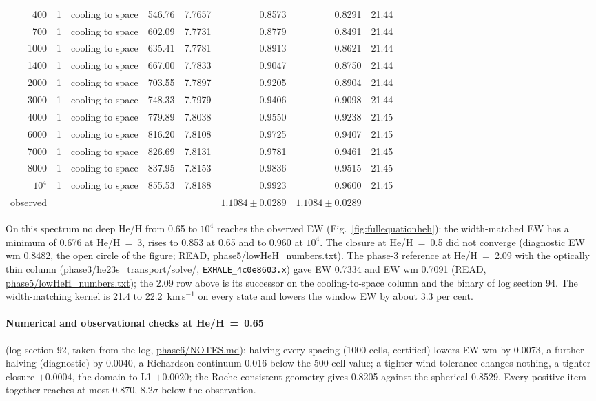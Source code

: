 \documentclass[11pt]{my_memo}
\begin{document}
\begin{longtable}{@{}r r l r r r r r@{}}
400 & 1 & cooling to space & 546.76 & 7.7657 & 0.8573 & 0.8291 & 21.44\\
700 & 1 & cooling to space & 602.09 & 7.7731 & 0.8779 & 0.8491 & 21.44\\
1000 & 1 & cooling to space & 635.41 & 7.7781 & 0.8913 & 0.8621 & 21.44\\
1400 & 1 & cooling to space & 667.00 & 7.7833 & 0.9047 & 0.8750 & 21.44\\
2000 & 1 & cooling to space & 703.55 & 7.7897 & 0.9205 & 0.8904 & 21.44\\
3000 & 1 & cooling to space & 748.33 & 7.7979 & 0.9406 & 0.9098 & 21.44\\
4000 & 1 & cooling to space & 779.89 & 7.8038 & 0.9550 & 0.9238 & 21.45\\
6000 & 1 & cooling to space & 816.20 & 7.8108 & 0.9725 & 0.9407 & 21.45\\
7000 & 1 & cooling to space & 826.69 & 7.8131 & 0.9781 & 0.9461 & 21.45\\
8000 & 1 & cooling to space & 837.95 & 7.8153 & 0.9836 & 0.9515 & 21.45\\
$10^{4}$ & 1 & cooling to space & 855.53 & 7.8188 & 0.9923 & 0.9600 & 21.45\\
\midrule
observed & & & & & $1.1084\pm0.0289$ & $1.1084\pm0.0289$ & \\
\bottomrule
\end{longtable}\normalsize

\noindent
On this spectrum no deep He/H from 0.65 to $10^{4}$ reaches the observed EW
(Fig.~\ref{fig:fullequationheh}): the width-matched EW has a minimum of
0.676 at He/H~=~3, rises to 0.853 at 0.65 and to 0.960 at $10^{4}$. The
closure at He/H~=~0.5 did not converge (diagnostic EW wm 0.8482, the open
circle of the figure; READ, \url{phase5/lowHeH_numbers.txt}). The phase-3
reference at He/H~=~2.09 with the optically thin column
(\url{phase3/he23s_transport/solve/}, \texttt{EXHALE\_4c0e8603.x}) gave EW
0.7334 and EW wm 0.7091 (READ, \url{phase5/lowHeH_numbers.txt}); the
2.09 row above is its successor on the cooling-to-space column and the
binary of log section 94. The width-matching kernel is 21.4 to 22.2~km\,s$^{-1}$
on every state and lowers the window EW by about 3.3 per cent.

\paragraph{Numerical and observational checks at He/H~=~0.65} (log section
92, taken from the log, \url{phase6/NOTES.md}): halving every spacing
(1000 cells, certified) lowers EW wm by 0.0073, a further halving
(diagnostic) by 0.0040, a Richardson continuum 0.016 below the 500-cell
value; a tighter wind tolerance changes nothing, a tighter closure
$+0.0004$, the domain to L1 $+0.0020$; the Roche-consistent geometry gives
0.8205 against the spherical 0.8529. Every positive item together reaches
at most 0.870, 8.2$\sigma$ below the observation.
\end{document}
